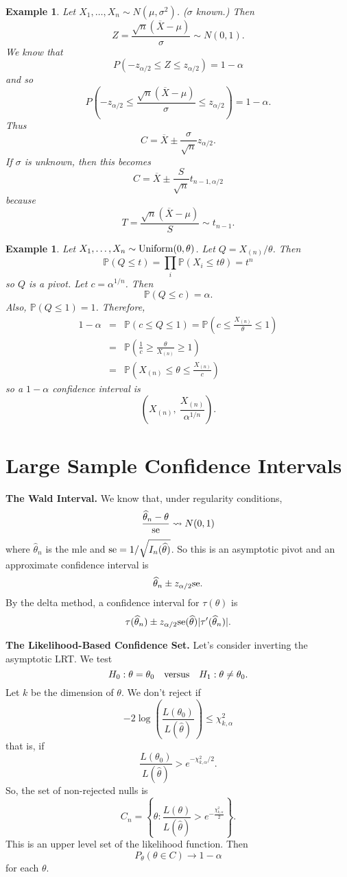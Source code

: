 \documentclass[twoside,12pt]{article}
\newtheorem{example}[theorem]{Example}
\begin{document}
\begin{example}
Let $X_1,\ldots, X_n\sim N(\mu,\sigma^2)$.
($\sigma$ known.)
Then
$$
Z = \frac{\sqrt{n}(\overline{X}-\mu)}{\sigma} \sim N(0,1).
$$
We know that
$$
P(-z_{\alpha/2}\leq Z \leq z_{\alpha/2}) = 1-\alpha
$$
and so
$$
P\left(-z_{\alpha/2}\leq \frac{\sqrt{n}(\overline{X}-\mu)}{\sigma} \leq z_{\alpha/2}\right) = 1-\alpha.
$$
Thus
$$
C = \overline{X} \pm \frac{\sigma}{\sqrt{n}} z_{\alpha/2}.
$$
If $\sigma$ is unknown, then this becomes
$$
C = \overline{X} \pm \frac{S}{\sqrt{n}} t_{n-1,\alpha/2}
$$
because
$$
T = \frac{\sqrt{n}(\overline{X}-\mu)}{S} \sim t_{n-1}.
$$
\end{example}


\begin{example}
Let $X_1,\ldots, X_n\sim {\rm Uniform}(0,\theta)$.
Let $Q = X_{(n)}/\theta$.
Then
$$
\mathbb{P}(Q \leq t ) = \prod_i \mathbb{P}(X_i  \leq t\theta ) = t^n
$$
so $Q$ is a pivot.
Let $c = \alpha^{1/n}$.
Then
$$
\mathbb{P}( Q \leq c) = \alpha.
$$
Also, $\mathbb{P}(Q\leq 1)=1$.
Therefore,
\begin{eqnarray*}
1-\alpha &=& \mathbb{P}( c \leq Q \leq 1) = 
\mathbb{P}\left( c \leq \frac{X_{(n)}}{\theta} \leq 1\right)\\
&=& \mathbb{P}\left( \frac{1}{c} \geq \frac{\theta}{X_{(n)}} \geq 1\right)\\
&=& \mathbb{P}\left( X_{(n)} \leq \theta \leq \frac{X_{(n)}}{c}\right)
\end{eqnarray*}
so a $1-\alpha$ confidence interval is
$$
\left(  X_{(n)},\  \frac{X_{(n)}}{\alpha^{1/n}}\right).
$$
\end{example}


\section{Large Sample Confidence Intervals}

{\bf The Wald Interval.}
We know that, under regularity conditions,
$$
\frac{\widehat\theta_n - \theta}{\rm se}\rightsquigarrow N(0,1)
$$
where
$\widehat\theta_n$ is the mle and
${\rm se} = 1/\sqrt{I_n(\widehat\theta)}$.
So this is an asymptotic pivot
and an approximate confidence interval is
$$
\widehat\theta_n \pm z_{\alpha/2} {\rm se}.
$$
By the delta method,
a confidence interval for $\tau(\theta)$ is
$$
\tau(\widehat\theta_n) \pm z_{\alpha/2} {\rm se}(\widehat\theta) |\tau'(\widehat\theta_n)|.
$$

\vspace{1cm}

{\bf The Likelihood-Based Confidence Set.}
Let's consider inverting the asymptotic LRT.
We test
$$
H_0: \theta=\theta_0\ \ \ {\rm versus}\ \ \ H_1 :\theta \neq \theta_0.
$$
Let $k$ be the dimension of $\theta$.
We don't reject if
$$
-2 \log \left(\frac{L(\theta_0)}{L(\widehat\theta)}\right) \leq \chi^2_{k,\alpha} 
$$
that is, if
$$
\frac{L(\theta_0)}{L(\widehat\theta)} > e^{-\chi^2_{k,\alpha}/2}.
$$
So, the set of non-rejected nulls is
$$
C_n = \left\{\theta:
\frac{L(\theta)}{L(\widehat\theta)} > e^{-\frac{\chi^2_{k,\alpha}}{2}}\right\}.
$$
This is an upper level set of the likelihood function.
Then
$$
P_\theta(\theta\in C) \to 1-\alpha
$$
for each $\theta$.
\end{document}
